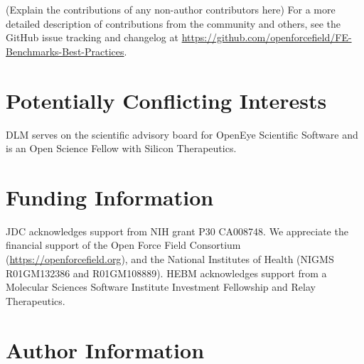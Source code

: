 \documentclass[9pt,bestpractices]{livecoms}
\newcommand{\githubrepository}{\url{https://github.com/openforcefield/FE-Benchmarks-Best-Practices}}  %
\begin{document}
(Explain the contributions of any non-author contributors here)
For a more detailed description of contributions from the community and others, see the GitHub issue tracking and changelog at \githubrepository.

\section{Potentially Conflicting Interests}

DLM serves on the scientific advisory board for OpenEye Scientific Software and is an Open Science Fellow with Silicon Therapeutics.

\section{Funding Information}
JDC acknowledges support from NIH grant P30 CA008748.
We appreciate the financial support of the Open Force Field Consortium (\url{https://openforcefield.org}), and the National Institutes of Health (NIGMS R01GM132386 and R01GM108889).
HEBM acknowledges support from a Molecular Sciences Software Institute Investment Fellowship and Relay Therapeutics. 


\section*{Author Information}
\makeorcid




\end{document}
